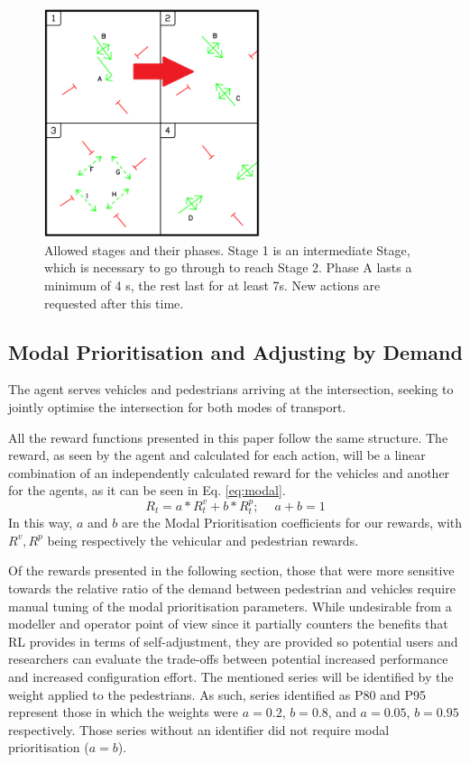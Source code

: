 \documentclass[a4paper, conference]{IEEEtran}
\begin{document}
\begin{figure}                                                
\centering                                                    
\includegraphics[width=2.5in]{phases_limited.png}                                    
\caption{Allowed stages and their phases. Stage 1 is an intermediate Stage, which is necessary to go through to reach Stage 2. Phase A lasts a minimum of 4 s, the rest last for at least 7s. New actions are requested after this time.}                                  
\label{intersection_phases}  
                                            
\end{figure}     
\subsection{Modal Prioritisation and Adjusting by Demand}
The agent serves vehicles and pedestrians arriving at the intersection, seeking to jointly optimise the intersection for both modes of transport.

All the reward functions presented in this paper follow the same structure.
The reward, as seen by the agent and calculated for each action, will be a linear combination of an independently calculated reward for the vehicles and another for the agents, as it can be seen in Eq. \ref{eq:modal}.
\begin{equation}
R_t = a * R^v_t + b * R^p_t;\,\,\,\,\,\,\ a+b = 1
\label{eq:modal}
\end{equation}
In this way, $a$ and $b$ are the Modal Prioritisation coefficients for our rewards, with $R^v, R^p$ being respectively the vehicular and pedestrian rewards.

Of the rewards presented in the following section, those that were more sensitive towards the relative ratio of the demand between pedestrian and vehicles require manual tuning of the modal prioritisation parameters.
While undesirable from a modeller and operator point of view since it partially counters the benefits that RL provides in terms of self-adjustment, they are provided so potential users and researchers can evaluate the trade-offs between potential increased performance and increased configuration effort.
The mentioned series will be identified by the weight applied to the pedestrians.
As such, series identified as P80 and P95 represent those in which the weights were $a=0.2$, $b=0.8$, and $a=0.05$, $b=0.95$ respectively. 
Those series without an identifier did not require modal prioritisation ($a = b$).
\end{document}
